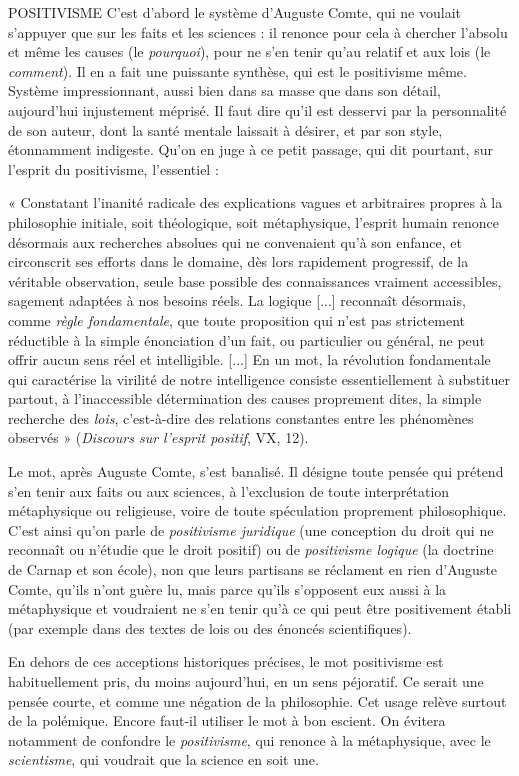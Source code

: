 POSITIVISME C’est d’abord le système d’Auguste Comte, qui ne voulait
s'appuyer que sur les faits et les sciences : il renonce pour
cela à chercher l'absolu et même les causes (le {\it pourquoi}), pour ne s’en tenir
qu’au relatif et aux lois (le {\it comment}). Il en a fait une puissante synthèse, qui est
le positivisme même. Système impressionnant, aussi bien dans sa masse que
dans son détail, aujourd’hui injustement méprisé. Il faut dire qu’il est desservi
par la personnalité de son auteur, dont la santé mentale laissait à désirer, et par
son style, étonnamment indigeste. Qu’on en juge à ce petit passage, qui dit
pourtant, sur l'esprit du positivisme, l'essentiel :

{\footnotesize 
« Constatant l’inanité radicale des explications vagues et arbitraires propres à la philosophie
initiale, soit théologique, soit métaphysique, l'esprit humain renonce désormais
aux recherches absolues qui ne convenaient qu’à son enfance, et circonscrit ses
efforts dans le domaine, dès lors rapidement progressif, de la véritable observation,
seule base possible des connaissances vraiment accessibles, sagement adaptées à nos
besoins réels. La logique [...] reconnaît désormais, comme {\it règle fondamentale}, que
toute proposition qui n’est pas strictement réductible à la simple énonciation d’un fait,
ou particulier ou général, ne peut offrir aucun sens réel et intelligible. [...] En un mot,
la révolution fondamentale qui caractérise la virilité de notre intelligence consiste essentiellement
à substituer partout, à l’inaccessible détermination des causes proprement
dites, la simple recherche des {\it lois}, c’est-à-dire des relations constantes entre les phénomènes
observés » ({\it Discours sur l'esprit positif}, VX, 12).
}

Le mot, après Auguste Comte, s’est banalisé. Il désigne toute pensée qui
prétend s’en tenir aux faits ou aux sciences, à l’exclusion de toute interprétation
métaphysique ou religieuse, voire de toute spéculation proprement philosophique.
C’est ainsi qu’on parle de {\it positivisme juridique} (une conception du
droit qui ne reconnaît ou n’étudie que le droit positif) ou de {\it positivisme logique}
(la doctrine de Carnap et son école), non que leurs partisans se réclament en
rien d’Auguste Comte, qu’ils n’ont guère lu, mais parce qu’ils s’opposent eux
aussi à la métaphysique et voudraient ne s’en tenir qu’à ce qui peut être positivement
établi (par exemple dans des textes de lois ou des énoncés scientifiques).

En dehors de ces acceptions historiques précises, le mot positivisme est
habituellement pris, du moins aujourd’hui, en un sens péjoratif. Ce serait une
pensée courte, et comme une négation de la philosophie. Cet usage relève surtout
de la polémique. Encore faut-il utiliser le mot à bon escient. On évitera
notamment de confondre le {\it positivisme}, qui renonce à la métaphysique, avec le
{\it scientisme}, qui voudrait que la science en soit une.

